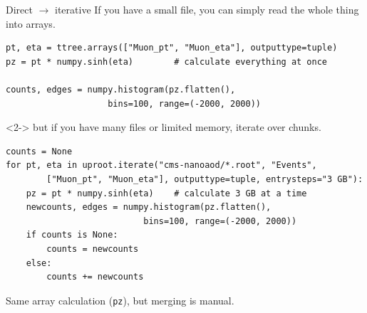 \documentclass[aspectratio=169]{beamer}
\begin{document}
\begin{frame}[fragile]{Direct $\to$ iterative}
\large
\vspace{0.25 cm}
If you have a small file, you can simply read the whole thing into arrays.

\small
\begin{verbatim}
pt, eta = ttree.arrays(["Muon_pt", "Muon_eta"], outputtype=tuple)
pz = pt * numpy.sinh(eta)        # calculate everything at once

counts, edges = numpy.histogram(pz.flatten(),
                    bins=100, range=(-2000, 2000))
\end{verbatim}

\large
\vspace{-0.1 cm}
\begin{uncoverenv}<2->
but if you have many files or limited memory, iterate over chunks.

\small
\vspace{-0.1 cm}
\begin{verbatim}
counts = None
for pt, eta in uproot.iterate("cms-nanoaod/*.root", "Events",
        ["Muon_pt", "Muon_eta"], outputtype=tuple, entrysteps="3 GB"):
    pz = pt * numpy.sinh(eta)    # calculate 3 GB at a time
    newcounts, edges = numpy.histogram(pz.flatten(),
                           bins=100, range=(-2000, 2000))
    if counts is None:
        counts = newcounts
    else:
        counts += newcounts
\end{verbatim}
\large

\vspace{-1.3 cm}
\hfill \begin{minipage}{0.35\linewidth}
Same array calculation (\texttt{pz}), but merging is manual.
\end{minipage}
\vspace{1.3 cm}
\end{uncoverenv}
\end{frame}
\end{document}
